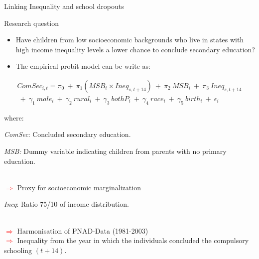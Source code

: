 \documentclass{beamer}
\begin{document}
\begin{frame}[label=main5]{Linking Inequality and school dropouts}
\begin{block}{Research question}
\begin{itemize}
\item \footnotesize Have children from low socioeconomic backgrounds who live in states with high income inequality levels a lower chance to conclude secondary education?
\end{itemize}
\end{block}
\begin{itemize}
\item \footnotesize The empirical probit model can be write as:
\end{itemize}
\begin{footnotesize}



\begin{equation} \label{eq:EduOutcome}
\begin{split}
ComSec_{i,t}=\pi_0 \:+\: \pi_1 \left(MSB_{i} \times Ineq_{s,t+14} \right) \:+\: \pi_2 \: MSB_{i}  \:+\: \pi_3 \: Ineq_{s,t+14} \\ \:+\: \gamma_1 \: male_{i} \:+\: \gamma_2 \: rural_{i} \:+\: \gamma_3 \: bothP_{i} \:+\: \gamma_4 \: race_{i} \:+\: \gamma_5 \: birth_{i} \:+\: \epsilon_{i} 
\end{split}
\end{equation}
\end{footnotesize}

{\scriptsize where:}
\begin{itemize}
{\scriptsize\item \textit{ComSec}:
Concluded secondary education.}
{\scriptsize\item \textit{MSB:} Dummy variable indicating children from parents with no primary education.}
\vspace{-0.1cm}
\\ \tiny \textcolor{red}{$\Longrightarrow$} Proxy for socioeconomic marginalization
{\scriptsize\item \textit{Ineq}: Ratio 75/10 of income distribution. \hyperlink{Harmonsation}{\beamerbutton {\textcolor{red}{Harmonsation of PNAD-Data}}}}
\\ \tiny \textcolor{red}{$\Longrightarrow$} Harmonisation of PNAD-Data (1981-2003)
\\ \tiny \textcolor{red}{$\Longrightarrow$} Inequality from the year in which the individuals concluded the compulsory schooling $(t+14)$.
\end{itemize}
\end{frame}
\end{document}
